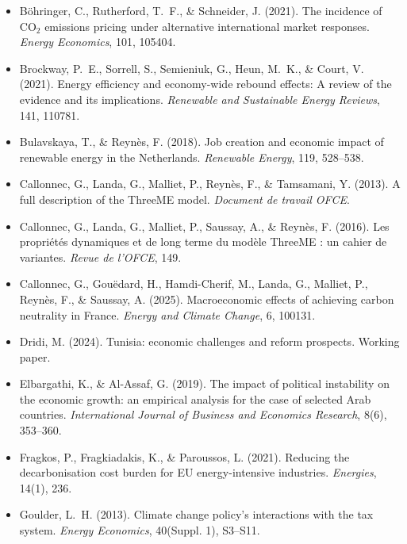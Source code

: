 \documentclass[12pt, a4paper]{article}
\begin{document}
\begin{itemize}[label={}, leftmargin=2em, itemindent=-2em, itemsep=2pt]
\item Böhringer, C., Rutherford, T.~F., \& Schneider, J. (2021). The incidence of CO$_2$ emissions pricing under alternative international market responses. \textit{Energy Economics}, 101, 105404.

\item Brockway, P.~E., Sorrell, S., Semieniuk, G., Heun, M.~K., \& Court, V. (2021). Energy efficiency and economy-wide rebound effects: A review of the evidence and its implications. \textit{Renewable and Sustainable Energy Reviews}, 141, 110781.

\item Bulavskaya, T., \& Reynès, F. (2018). Job creation and economic impact of renewable energy in the Netherlands. \textit{Renewable Energy}, 119, 528--538.

\item Callonnec, G., Landa, G., Malliet, P., Reynès, F., \& Tamsamani, Y. (2013). A full description of the ThreeME model. \textit{Document de travail OFCE}.

\item Callonnec, G., Landa, G., Malliet, P., Saussay, A., \& Reynès, F. (2016). Les propriétés dynamiques et de long terme du modèle ThreeME : un cahier de variantes. \textit{Revue de l'OFCE}, 149.

\item Callonnec, G., Gouëdard, H., Hamdi-Cherif, M., Landa, G., Malliet, P., Reynès, F., \& Saussay, A. (2025). Macroeconomic effects of achieving carbon neutrality in France. \textit{Energy and Climate Change}, 6, 100131.

\item Dridi, M. (2024). Tunisia: economic challenges and reform prospects. Working paper.

\item Elbargathi, K., \& Al-Assaf, G. (2019). The impact of political instability on the economic growth: an empirical analysis for the case of selected Arab countries. \textit{International Journal of Business and Economics Research}, 8(6), 353--360.

\item Fragkos, P., Fragkiadakis, K., \& Paroussos, L. (2021). Reducing the decarbonisation cost burden for EU energy-intensive industries. \textit{Energies}, 14(1), 236.

\item Goulder, L.~H. (2013). Climate change policy's interactions with the tax system. \textit{Energy Economics}, 40(Suppl. 1), S3--S11.


\end{itemize}
\end{document}
